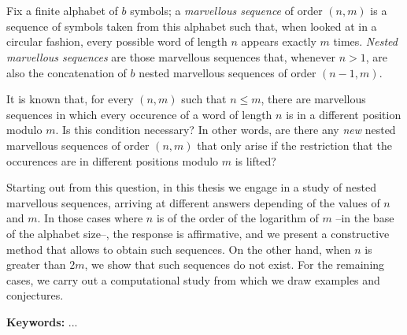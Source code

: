 \chapter*{\runtitle}

Fix a finite alphabet of $b$ symbols; a \emph{marvellous sequence} of
order $(n,m)$ is a sequence of symbols taken from this alphabet such that,
when looked at in a circular fashion, every possible word of length $n$ appears
exactly $m$ times.
\emph{Nested marvellous sequences} are those marvellous sequences that, whenever
$n > 1$, are also the concatenation of $b$ nested marvellous sequences of order
$(n-1,m)$.

It is known that, for every $(n,m)$ such that $n \leq m$, there are marvellous
sequences in which every occurence of a word of length $n$ is in a different
position modulo $m$. Is this condition necessary? In other words,
are there any \emph{new} nested marvellous sequences of order $(n,m)$ that only
arise if the restriction that the occurences are in different positions modulo
$m$ is lifted?

Starting out from this question, in this thesis we engage in a study of nested
marvellous sequences, arriving at different answers depending of the values of
$n$ and $m$. In those cases where $n$ is of the order of the logarithm of $m$
--in the base of the alphabet size--, the response is affirmative, and we
present a constructive method that allows to obtain such sequences. On the other
hand, when $n$ is greater than $2m$, we show that such sequences do not exist.
For the remaining cases, we carry out a computational study from which we
draw examples and conjectures.

\bigskip

\noindent\textbf{Keywords:} ...